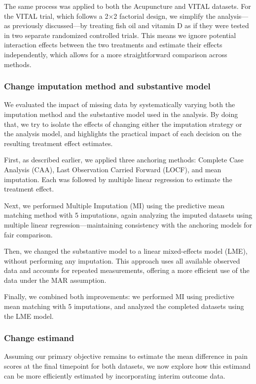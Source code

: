 \documentclass{article}
\begin{document}
The same process was applied to both the Acupuncture and VITAL datasets.
For the VITAL trial, which follows a 2×2 factorial design, we simplify
the analysis---as previously discussed---by treating fish oil and
vitamin D as if they were tested in two separate randomized controlled
trials. This means we ignore potential interaction effects between the
two treatments and estimate their effects independently, which allows
for a more straightforward comparison across methods.

\subsubsection{Change imputation method and substantive
model}\label{change-imputation-method-and-substantive-model}

We evaluated the impact of missing data by systematically varying both
the imputation method and the substantive model used in the analysis. By
doing that, we try to isolate the effects of changing either the
imputation strategy or the analysis model, and highlights the practical
impact of each decision on the resulting treatment effect estimates.

First, as described earlier, we applied three anchoring methods:
Complete Case Analysis (CAA), Last Observation Carried Forward (LOCF),
and mean imputation. Each was followed by multiple linear regression to
estimate the treatment effect.

Next, we performed Multiple Imputation (MI) using the predictive mean
matching method with 5 imputations, again analyzing the imputed datasets
using multiple linear regression---maintaining consistency with the
anchoring models for fair comparison.

Then, we changed the substantive model to a linear mixed-effects model
(LME), without performing any imputation. This approach uses all
available observed data and accounts for repeated measurements, offering
a more efficient use of the data under the MAR assumption.

Finally, we combined both improvements: we performed MI using predictive
mean matching with 5 imputations, and analyzed the completed datasets
using the LME model.

\subsubsection{Change estimand}\label{change-estimand}

Assuming our primary objective remains to estimate the mean difference
in pain scores at the final timepoint for both datasets, we now explore
how this estimand can be more efficiently estimated by incorporating
interim outcome data.
\end{document}
